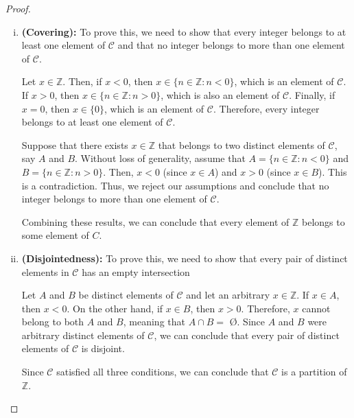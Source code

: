\documentclass{article}
\begin{document}
\begin{enumerate}
\begin{enumerate}
\begin{proof}
\begin{enumerate}[i.]
                                \item \textbf{(Covering):} To prove this, we need to show that every integer belongs to at least one element of $\mathcal{C}$ and that no integer belongs to more than one element of $\mathcal{C}$.
                                    \begin{subproof}[Subproof 1]
                                        Let $x\in\mathbb{Z}$. Then, if $x < 0$, then $x \in\{ n\in\mathbb{Z}:n < 0 \}$, which is an element of $\mathcal{C}$. If $x > 0$, then $x \in\{ n\in\mathbb{Z}:n > 0 \}$, which is also an element of $\mathcal{C}$. Finally, if $x = 0$, then $x \in\{ 0 \}$, which is an element of $\mathcal{C}$. Therefore, every integer belongs to at least one element of $\mathcal{C}$.
                                    \end{subproof}
                                    \begin{subproof}[Subproof 2]
                                        Suppose that there exists $x\in\mathbb{Z}$ that belongs to two distinct elements of $\mathcal{C}$, say $A$ and $B$. Without loss of generality, assume that $A = \{ n\in\mathbb{Z}:n < 0 \}$ and $B = \{ n\in\mathbb{Z}:n > 0 \}$. Then, $x < 0$ (since $x \in A$) and $x > 0$ (since $x \in B$). This is a contradiction. Thus, we reject our assumptions and conclude that no integer belongs to more than one element of $\mathcal{C}$.
                                    \end{subproof}
                                    Combining these results, we can conclude that every element of $\mathbb{Z}$ belongs to some element of $C$. \\

                                \item\textbf{(Disjointedness):} To prove this, we need to show that every pair of distinct elements in $\mathcal{C}$ has an empty intersection
                                    \begin{subproof}[Subproof]
                                        Let $A$ and $B$ be distinct elements of $\mathcal{C}$ and let an arbitrary $x\in\mathbb{Z}$. If $x \in A$, then $x < 0$. On the other hand, if $x \in B$, then $x > 0$. Therefore, $x$ cannot belong to both $A$ and $B$, meaning that $A \cap B =$ \O. Since $A$ and $B$ were arbitrary distinct elements of $\mathcal{C}$, we can conclude that every pair of distinct elements of $\mathcal{C}$ is disjoint.
                                    \end{subproof}
                                Since $\mathcal{C}$ satisfied all three conditions, we can conclude that $\mathcal{C}$ is a partition of $\mathbb{Z}$.
                            \end{enumerate}
                                

\end{proof}
\end{enumerate}
\end{enumerate}
\end{document}
